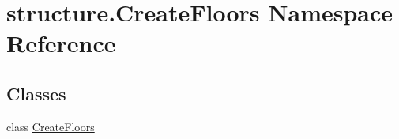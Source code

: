 \hypertarget{namespacestructure_1_1_create_floors}{\section{structure.\-Create\-Floors Namespace Reference}
\label{namespacestructure_1_1_create_floors}
}
\subsection*{Classes}
\begin{DoxyCompactItemize}
\item 
class \hyperlink{classstructure_1_1_create_floors_1_1_create_floors}{Create\-Floors}
\end{DoxyCompactItemize}
